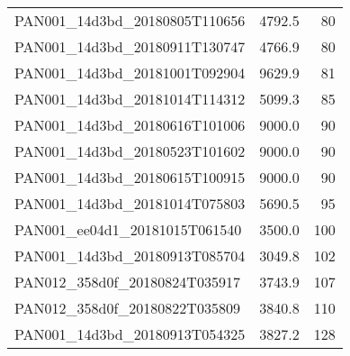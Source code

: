 \begin{tabular}{lrr}
PAN001\_14d3bd\_20180805T110656 &     4792.5 &       80 \\
PAN001\_14d3bd\_20180911T130747 &     4766.9 &       80 \\
PAN001\_14d3bd\_20181001T092904 &     9629.9 &       81 \\
PAN001\_14d3bd\_20181014T114312 &     5099.3 &       85 \\
PAN001\_14d3bd\_20180616T101006 &     9000.0 &       90 \\
PAN001\_14d3bd\_20180523T101602 &     9000.0 &       90 \\
PAN001\_14d3bd\_20180615T100915 &     9000.0 &       90 \\
PAN001\_14d3bd\_20181014T075803 &     5690.5 &       95 \\
PAN001\_ee04d1\_20181015T061540 &     3500.0 &      100 \\
PAN001\_14d3bd\_20180913T085704 &     3049.8 &      102 \\
PAN012\_358d0f\_20180824T035917 &     3743.9 &      107 \\
PAN012\_358d0f\_20180822T035809 &     3840.8 &      110 \\
PAN001\_14d3bd\_20180913T054325 &     3827.2 &      128 \\
\bottomrule
\end{tabular}
